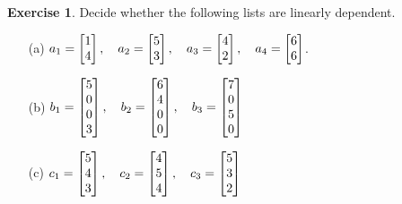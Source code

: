 \documentclass[a4paper]{amsart}
\theoremstyle{definition}
\newtheorem{exercise}{Exercise}
\begin{document}
\begin{exercise}\label{ex-independent-i}
 Decide whether the following lists are linearly dependent.
 \begin{itemize}
  \item[(a)] $\displaystyle
              a_1=\left[\begin{matrix} 1\\4\end{matrix}\right],\quad 
              a_2=\left[\begin{matrix} 5\\3\end{matrix}\right],\quad 
              a_3=\left[\begin{matrix} 4\\2\end{matrix}\right],\quad 
              a_4=\left[\begin{matrix} 6\\6\end{matrix}\right]
             $.
  \item[(b)] $\displaystyle
              b_1=\left[\begin{matrix} 5\\0\\0\\3\end{matrix}\right],\quad
              b_2=\left[\begin{matrix} 6\\4\\0\\0\end{matrix}\right],\quad
              b_3=\left[\begin{matrix} 7\\0\\5\\0\end{matrix}\right]
             $
  \item[(c)] $\displaystyle
              c_1=\left[\begin{matrix} 5\\4\\3\end{matrix}\right],\quad
              c_2=\left[\begin{matrix} 4\\5\\4\end{matrix}\right],\quad
              c_3=\left[\begin{matrix} 5\\3\\2\end{matrix}\right]
             $
 \end{itemize}
\end{exercise}
\end{document}
